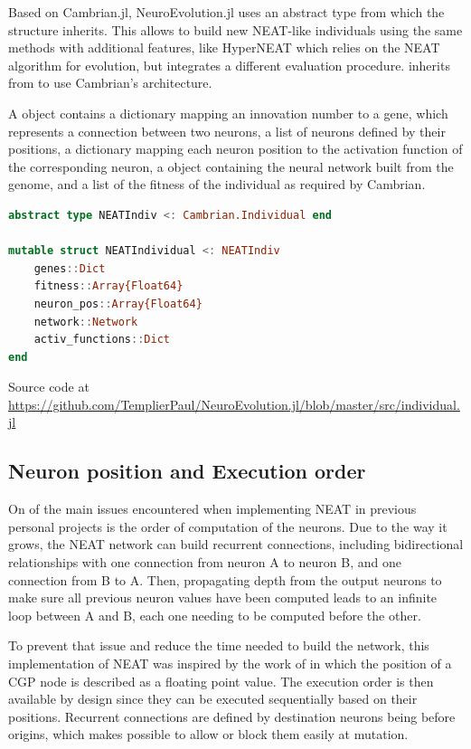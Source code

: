 Based on Cambrian.jl, NeuroEvolution.jl uses an abstract type  from which the structure  inherits. This allows to build new NEAT-like individuals using the same methods with additional features, like HyperNEAT which relies on the NEAT algorithm for evolution, but integrates a different evaluation procedure.  inherits from  to use Cambrian's architecture.

A  object contains a dictionary mapping an innovation number to a gene, which represents a connection between two neurons, a list of neurons defined by their positions, a dictionary mapping each neuron position to the activation function of the corresponding neuron, a  object containing the neural network built from the genome, and a list of the fitness of the individual as required by Cambrian.

\begin{minipage}{\linewidth}
\begin{lstlisting}[language=Julia, caption=NEAT Individual]
abstract type NEATIndiv <: Cambrian.Individual end

mutable struct NEATIndividual <: NEATIndiv
    genes::Dict
    fitness::Array{Float64}
    neuron_pos::Array{Float64}
    network::Network
    activ_functions::Dict
end
\end{lstlisting}
Source code at \url{https://github.com/TemplierPaul/NeuroEvolution.jl/blob/master/src/individual.jl}\\
\end{minipage}

\subsection{Neuron position and Execution order}
\label{subsec:NEAT_neur_pos}

On of the main issues encountered when implementing NEAT in previous personal projects is the order of computation of the neurons. Due to the way it grows, the NEAT network can build recurrent connections, including bidirectional relationships with one connection from neuron A to neuron B, and one connection from B to A. Then, propagating depth from the output neurons to make sure all previous neuron values have been computed leads to an infinite loop between A and B, each one needing to be computed before the other. 

To prevent that issue and reduce the time needed to build the network, this implementation of NEAT was inspired by the work of \cite{wilson2018positionalcgp} in which the position of a CGP node is described as a floating point value. The execution order is then available by design since they can be executed sequentially based on their positions. Recurrent connections are defined by destination neurons being before origins, which makes possible to allow or block them easily at mutation. 

